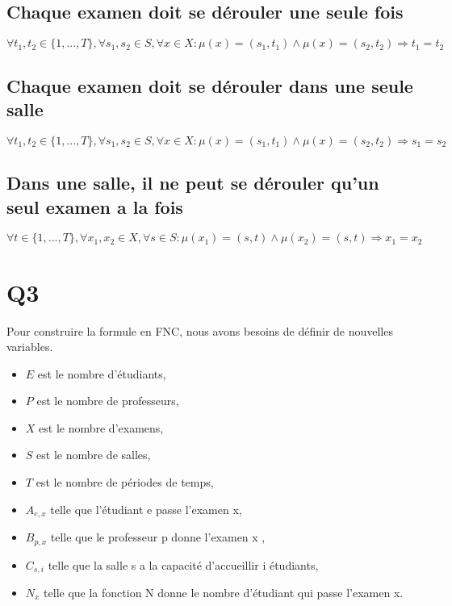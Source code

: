 \documentclass[a4paper,11pt]{article}
\begin{document}
\subsection {Chaque examen doit se dérouler une seule fois}
\begin{displaymath}
\forall t_{1}, t_{2} \in \{1,...,T\},\forall s_{1},s_{2} \in S, \forall x \in X : \mu(x) = (s_{1},t_{1}) \wedge \mu(x) = (s_{2},t_{2}) \Rightarrow t_{1} = t_{2}
\end{displaymath}

\subsection {Chaque examen doit se dérouler dans une seule salle}
\begin{displaymath}
\forall t_{1}, t_{2} \in \{1,...,T\},\forall s_{1},s_{2} \in S, \forall x \in X : \mu(x) = (s_{1},t_{1}) \wedge \mu(x) = (s_{2},t_{2}) \Rightarrow s_{1} = s_{2}
\end{displaymath}

\subsection {Dans une salle, il ne peut se dérouler qu'un seul examen a la fois}
\begin{displaymath}
\forall t \in \{1,...,T\},\forall x_{1},x_{2} \in X, \forall s \in S : \mu(x_{1}) = (s,t) \wedge \mu(x_{2}) = (s,t) \Rightarrow x_{1} = x_{2}
\end{displaymath}	

\section{Q3}
Pour construire la formule en FNC, nous avons besoins de définir de nouvelles variables.
\begin{itemize}
    \item \(E\) est le nombre d'étudiants,
    \item \(P\) est le nombre de professeurs,
    \item \(X\) est le nombre d'examens,
    \item \(S\) est le nombre de salles,
    \item \(T\) est le nombre de périodes de temps,
	\item \( A_{e,x}\) telle que l'étudiant e passe l'examen x,
	\item \(B_{p,x}\) telle que le professeur p donne l'examen x ,
	\item \(C_{s,i}\) telle que la salle s a la capacité d'accueillir i étudiants,
	\item \(N_{x}\) telle que la fonction N donne le nombre d'étudiant qui passe l'examen x.
\end{itemize}
\end{document}
